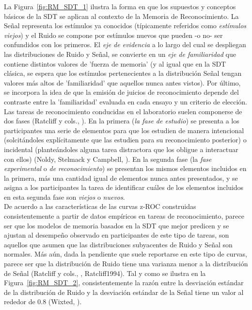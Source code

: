 La Figura~\ref{fig:RM_SDT_1} ilustra la forma en que los supuestos y conceptos básicos de la SDT se aplican al contexto de la Memoria de Reconocimiento. La Señal representa los estímulos ya conocidos (típicamente referidos como \textit{estímulos viejos}) y el Ruido se compone por estímulos nuevos que pueden -o no- ser confundidos con los primeros. El \textit{eje de evidencia} a lo largo del cual se despliegan las distribuciones de Ruido y Señal, se convierte en un \textit{eje de familiaridad} que contiene distintos valores de 'fuerza de memoria' (y al igual que en la SDT clásica, se espera que los estímulos pertenecientes a la distribución Señal tengan valores más altos de 'familiaridad' que aquellos nunca antes vistos). Por último, se incorpora la idea de que la emisión de juicios de reconocimiento depende del contraste entre la 'familiaridad' evaluada en cada ensayo y un criterio de elección.\\

Las tareas de reconocimiento conducidas en el laboratorio suelen componerse de dos fases (Ratcliff y cols., \citeyear{Ratcliff1992}). En la primera (\textit{la fase de estudio}) se presenta a los participantes una serie de elementos para que los estudien de manera intencional (solcitándoles explícitamente que las estudien para su reconocimiento posterior) o incidental (planteándoles alguna tarea distractora que los obligue a interactuar con ellos) (Noldy, Stelmack y Campbell, \citeyear{Noldy1990}). En la segunda fase (la \textit{fase experimental} o \textit{de reconocimiento}) se presentan los mismos elementos incluidos en la primera, más una cantidad igual de elementos nunca antes presentados, y se asigna a los participantes la tarea de identificar cuáles de los elementos incluidos en esta segunda fase son \textit{viejos} o \textit{nuevos}.\\

De acuerdo a las características de las curvas z-ROC construidas consistentemente a partir de datos empíricos en tareas de reconocimiento, parece ser que los modelos de memoria basados en la SDT que mejor predicen y se ajustan al desempeño observado en participantes de este tipo de tareas, son aquellos que asumen que las distribuciones subyacentes de Ruido y Señal son normales. Más aún, dada la pendiente que suele reportarse en este tipo de curvas, parece ser que la distribución de Ruido tiene una varianza menor a la distribución de Señal (Ratcliff y cols., \citeyear{ Ratcliff1992}, {Ratcliff1994}). Tal y como se ilustra en la Figura~\ref{fig:RM_SDT_2}, consistentemente la razón entre la desviación estándar de la distribución de Ruido y la desviación estándar de la Señal tiene un valor al rededor de 0.8 (Wixted, \citeyear{Wixted2007}).\\

